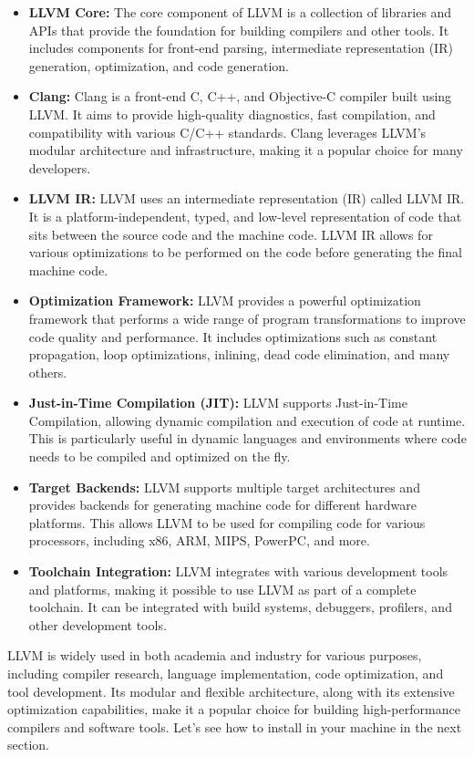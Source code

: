\begin{itemize}
    \item \textbf{LLVM Core:} The core component of LLVM is a collection of libraries and APIs that provide the foundation for building compilers and other tools. It includes components for front-end parsing, intermediate representation (IR) generation, optimization, and code generation.
    \item \textbf{Clang:} Clang is a front-end C, C++, and Objective-C compiler built using LLVM. It aims to provide high-quality diagnostics, fast compilation, and compatibility with various C/C++ standards. Clang leverages LLVM's modular architecture and infrastructure, making it a popular choice for many developers.
    \item \textbf{LLVM IR:} LLVM uses an intermediate representation (IR) called LLVM IR. It is a platform-independent, typed, and low-level representation of code that sits between the source code and the machine code. LLVM IR allows for various optimizations to be performed on the code before generating the final machine code.
    \item \textbf{Optimization Framework:} LLVM provides a powerful optimization framework that performs a wide range of program transformations to improve code quality and performance. It includes optimizations such as constant propagation, loop optimizations, inlining, dead code elimination, and many others.
    \item \textbf{Just-in-Time Compilation (JIT):} LLVM supports Just-in-Time Compilation, allowing dynamic compilation and execution of code at runtime. This is particularly useful in dynamic languages and environments where code needs to be compiled and optimized on the fly.
    \item \textbf{Target Backends:} LLVM supports multiple target architectures and provides backends for generating machine code for different hardware platforms. This allows LLVM to be used for compiling code for various processors, including x86, ARM, MIPS, PowerPC, and more.
    \item \textbf{Toolchain Integration:} LLVM integrates with various development tools and platforms, making it possible to use LLVM as part of a complete toolchain. It can be integrated with build systems, debuggers, profilers, and other development tools.
\end{itemize}

LLVM is widely used in both academia and industry for various purposes, including compiler research, language implementation, code optimization, and tool development. Its modular and flexible architecture, along with its extensive optimization capabilities, make it a popular choice for building high-performance compilers and software tools. Let's see how to install in your machine in the next section.

